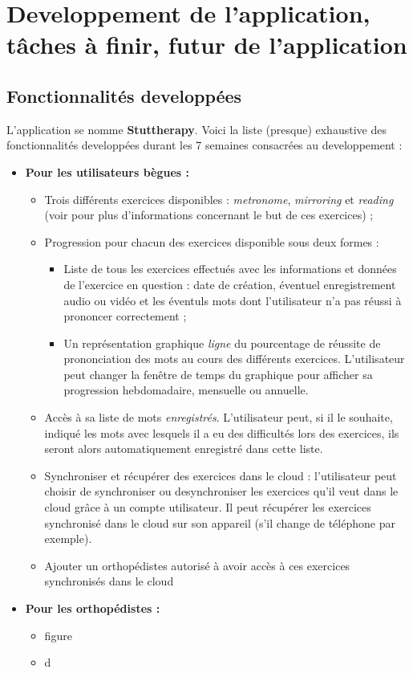 \section{Developpement de l'application, tâches à finir, futur de l'application}

\subsection{Fonctionnalités developpées}
L'application se nomme \textbf{Stuttherapy}. Voici la liste (presque) exhaustive des fonctionnalités developpées durant les 7 semaines consacrées au developpement :

\begin{itemize}

  \item \textbf{Pour les utilisateurs bègues :}
  \begin{itemize}
    \item Trois différents exercices disponibles : \textit{metronome}, \textit{mirroring} et \textit{reading} (voir  pour plus d'informations concernant le but de ces exercices) ;
    \item Progression pour chacun des exercices disponible sous deux formes :
    \begin{itemize}
      \item Liste de tous les exercices effectués avec les informations et données de l'exercice en question : date de création, éventuel enregistrement audio ou vidéo et les éventuls mots dont l'utilisateur n'a pas réussi à prononcer correctement ;
      \item Un représentation graphique \textit{ligne} du pourcentage de réussite de prononciation des mots au cours des différents exercices. L'utilisateur peut changer la fenêtre de temps du graphique pour afficher sa progression hebdomadaire, mensuelle ou annuelle.
    \end{itemize}
    \item Accès à sa liste de mots \textit{enregistrés}. L'utilisateur peut, si il le souhaite, indiqué les mots avec lesquels il a eu des difficultés lors des exercices, ils seront alors automatiquement enregistré dans cette liste.
    \item Synchroniser et récupérer des exercices dans le cloud : l'utilisateur peut choisir de synchroniser ou desynchroniser les exercices qu'il veut dans le cloud grâce à un compte utilisateur. Il peut récupérer les exercices synchronisé dans le cloud sur son appareil (s'il change de téléphone par exemple).
    \item Ajouter un orthopédistes autorisé à avoir accès à ces exercices synchronisés dans le cloud
  \end{itemize}

  \item \textbf{Pour les orthopédistes :}
  \begin{itemize}
    \item figure
    \item d
  \end{itemize}
\end{itemize}

